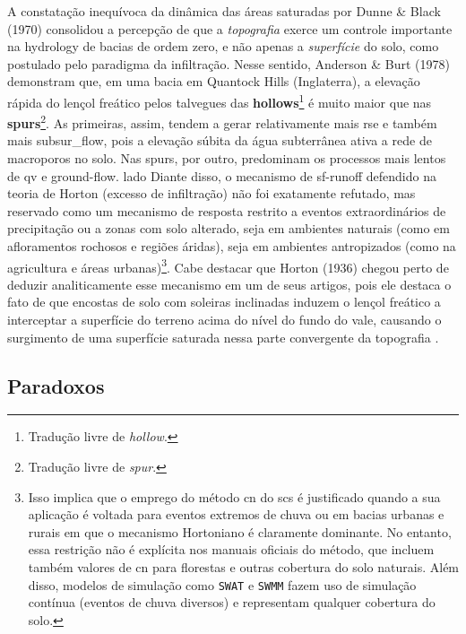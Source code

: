 \documentclass[./main.tex]{subfiles}
\begin{document}
\par A constatação inequívoca da dinâmica das áreas saturadas por Dunne \& Black (1970) consolidou a percepção de que a \textit{topografia} exerce um controle importante na \gls{hydrology} de bacias de ordem zero, e não apenas a \textit{superfície} do solo, como postulado pelo \gls{paradigma} da infiltração. Nesse sentido, Anderson \& Burt (1978) \cite{Anderson1978} demonstram que, em uma bacia em Quantock Hills (Inglaterra), a elevação rápida do lençol freático pelos talvegues das \textbf{\gls{hollows}}\footnote{Tradução livre de \textit{hollow}.} é muito maior que nas \textbf{\gls{spurs}}\footnote{Tradução livre de \textit{spur}.}. As primeiras, assim, tendem a gerar relativamente mais \gls{rse} e também mais \gls{subsur_flow}, pois a elevação súbita da água subterrânea ativa a rede de macroporos no solo. Nas \gls{spurs}, por outro, predominam os processos mais lentos de \gls{qv} e \gls{ground-flow}. lado Diante disso, o mecanismo de \gls{sf-runoff} defendido na \gls{teoria} de Horton (excesso de infiltração) não foi exatamente refutado, mas reservado como um mecanismo de resposta restrito a eventos extraordinários de precipitação ou a zonas com solo alterado, seja em ambientes naturais (como em afloramentos rochosos e regiões áridas), seja em ambientes antropizados (como na agricultura e áreas urbanas)\footnote{Isso implica que o emprego do método \acrshort{cn} do \acrshort{scs} é justificado quando a sua aplicação é voltada para eventos extremos de chuva ou em bacias urbanas e rurais em que o mecanismo Hortoniano é claramente dominante. No entanto, essa restrição não é explícita nos manuais oficiais do método, que incluem também valores de \acrshort{cn} para florestas e outras cobertura do solo naturais. Além disso, modelos de simulação como \texttt{SWAT} e \texttt{SWMM} fazem uso de simulação contínua (eventos de chuva diversos) e representam qualquer cobertura do solo.}. Cabe destacar que Horton (1936) \cite{Horton1936} chegou perto de deduzir analiticamente esse mecanismo em um de seus artigos, pois ele destaca o fato de que encostas de solo com soleiras inclinadas induzem o lençol freático a interceptar a superfície do terreno acima do nível do fundo do vale, causando o surgimento de uma superfície saturada nessa parte convergente da topografia \cite{Beven2004b}.

\subsection{Paradoxos}
\end{document}
